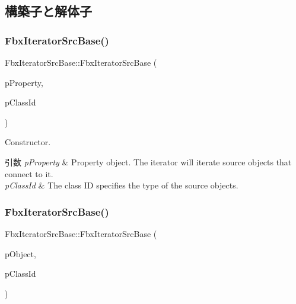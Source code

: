 \subsection{構築子と解体子}
\mbox{\label{class_fbx_iterator_src_base_a98ce94a7c69a7e7bac6e01901a0a7500}} 
\subsubsection{\texorpdfstring{Fbx\+Iterator\+Src\+Base()}{FbxIteratorSrcBase()}\hspace{0.1cm}{\footnotesize\ttfamily [1/2]}}
{\footnotesize\ttfamily Fbx\+Iterator\+Src\+Base\+::\+Fbx\+Iterator\+Src\+Base (\begin{DoxyParamCaption}\item[{\hyperlink{class_fbx_property}{Fbx\+Property} \&}]{p\+Property,  }\item[{\hyperlink{class_fbx_class_id}{Fbx\+Class\+Id}}]{p\+Class\+Id }\end{DoxyParamCaption})}

Constructor. 
\begin{DoxyParams}{引数}
{\em p\+Property} & Property object. The iterator will iterate source objects that connect to it. \\
\hline
{\em p\+Class\+Id} & The class ID specifies the type of the source objects. \\
\hline
\end{DoxyParams}
\mbox{\label{class_fbx_iterator_src_base_a17e8eab0754f02a28ca18b0e176f1533}} 
\subsubsection{\texorpdfstring{Fbx\+Iterator\+Src\+Base()}{FbxIteratorSrcBase()}\hspace{0.1cm}{\footnotesize\ttfamily [2/2]}}
{\footnotesize\ttfamily Fbx\+Iterator\+Src\+Base\+::\+Fbx\+Iterator\+Src\+Base (\begin{DoxyParamCaption}\item[{\hyperlink{class_fbx_object}{Fbx\+Object} $\ast$}]{p\+Object,  }\item[{\hyperlink{class_fbx_class_id}{Fbx\+Class\+Id}}]{p\+Class\+Id }\end{DoxyParamCaption})}

